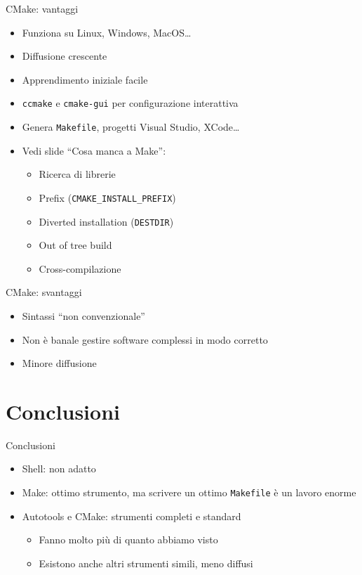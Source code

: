 \documentclass[xetex,table]{beamer}
\begin{document}
\begin{frame}{CMake: vantaggi}
  \begin{itemize}

  \item Funziona su Linux, Windows, MacOS\dots
  \item Diffusione crescente
  \item Apprendimento iniziale facile
  \item \texttt{ccmake} e \texttt{cmake-gui} per configurazione interattiva
  \item Genera \texttt{Makefile}, progetti Visual Studio, XCode\dots

  \item Vedi slide ``Cosa manca a Make'':
    \begin{itemize}
    \item Ricerca di librerie
    \item Prefix (\texttt{CMAKE\_INSTALL\_PREFIX})
    \item Diverted installation (\texttt{DESTDIR})
    \item Out of tree build
    \item Cross-compilazione
    \end{itemize}

  \end{itemize}
\end{frame}

\begin{frame}{CMake: svantaggi}
  \begin{itemize}
  \item Sintassi ``non convenzionale''
  \item Non è banale gestire software complessi in modo corretto
  \item Minore diffusione
  \end{itemize}
\end{frame}

\section{Conclusioni}

\begin{frame}{Conclusioni}
  \begin{itemize}
  \item Shell: non adatto
  \item Make: ottimo strumento, ma scrivere un ottimo
    \texttt{Makefile} è un lavoro enorme
  \item Autotools e CMake: strumenti completi e standard
    \begin{itemize}
    \item Fanno molto più di quanto abbiamo visto
    \item Esistono anche altri strumenti simili, meno diffusi
    \end{itemize}
  \end{itemize}
\end{frame}
\end{document}
